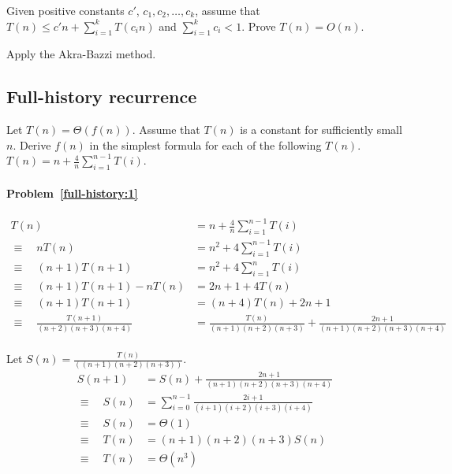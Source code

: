 \begin{Exercise}[origin={NCTU CSIE 92}]
Given positive constants $c'$, $c_1, c_2, \dots, c_k$, assume that $T(n) \leq  c'n + \sum_{i=1}^k T(c_in)$ and $\sum_{i=1}^k c_i < 1$. Prove $T(n) = O(n)$.
\end{Exercise}
\begin{Answer}
Apply the Akra\--Bazzi method.
\end{Answer}


\subsection{Full-history recurrence}
\begin{Exercise}[origin={NTU CSIE 90}]
Let $T(n) = \Theta(f(n))$. Assume that $T(n)$ is a constant for sufficiently small $n$. Derive $f(n)$ in the simplest formula for each of the following $T(n)$.
\Question $T(n) = n + \frac{4}{n} \sum_{i=1}^{n-1} T(i)$. \label{full-history:1}
\end{Exercise}
\begin{Answer}

\paragraph{Problem~\ref{full-history:1}}
\begin{align*}
T(n) & = n + \frac{4}{n} \sum_{i=1}^{n-1} T(i) \\
\equiv \quad nT(n) &= n^2 + 4\sum_{i=1}^{n-1} T(i) \\
\equiv \quad (n+1)T(n+1) &= n^2 + 4\sum_{i=1}^{n} T(i) \\
\equiv \quad (n+1)T(n+1) - nT(n) &= 2n + 1 + 4T(n) \\
\equiv \quad (n+1)T(n+1) &= (n+4)T(n) + 2n + 1 \\
\equiv \quad \frac{T(n+1)}{(n+2)(n+3)(n+4)} &= \frac{T(n)}{(n+1)(n+2)(n+3)} + \frac{2n+1}{(n+1)(n+2)(n+3)(n+4)} \\
\end{align*}

Let $S(n) = \frac{T(n)}{((n+1)(n+2)(n+3))}$.
\begin{align*}
S(n+1) & = S(n) + \frac{2n+1}{(n+1)(n+2)(n+3)(n+4)} \\
\equiv \quad S(n) &= \sum_{i=0}^{n-1} \frac{2i+1}{(i+1)(i+2)(i+3)(i+4)}\\
\equiv \quad S(n) &= \Theta(1) \\
\equiv \quad T(n) &= (n+1)(n+2)(n+3)S(n) \\
\equiv \quad T(n) &= \Theta(n^3) \\
\end{align*}
\end{Answer}


